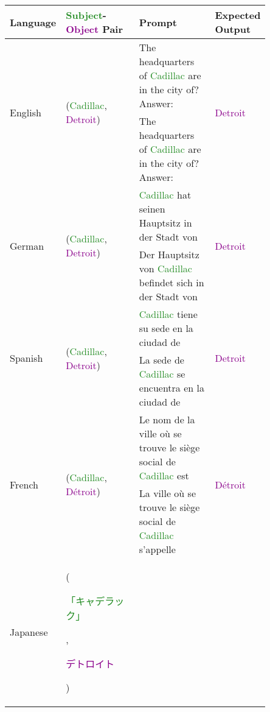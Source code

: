 \begin{table*}[htbp]
\scriptsize
\centering
\setlength{\tabcolsep}{1.0mm}{}
\begin{center}
\begin{tabular}{m{0.10\linewidth} p{0.30\linewidth} p{0.30\linewidth} m{0.15\linewidth}}
\textbf{Language} & \textbf{\textcolor{forestgreen}{Subject}-\textcolor{darkmagenta}{Object} Pair} & \textbf{Prompt} & \textbf{Expected Output} \\
\toprule
\multirow{2}{*}{\centering English} 
    & \multirow{2}{*}{\raggedright (\textcolor{forestgreen}{Cadillac}, \textcolor{darkmagenta}{Detroit})}
    & The headquarters of \textcolor{forestgreen}{Cadillac} are in the city of? \newline Answer:
    & \multirow{2}{*}{\centering \textcolor{darkmagenta}{Detroit}} \\
    & 
    & The headquarters of \textcolor{forestgreen}{Cadillac} are in the city of? \newline Answer:
    & \\
\midrule
\multirow{2}{*}{\centering German} 
    & \multirow{2}{*}{\raggedright (\textcolor{forestgreen}{Cadillac}, \textcolor{darkmagenta}{Detroit})}
    & \textcolor{forestgreen}{Cadillac} hat seinen Hauptsitz in der Stadt von 
    & \multirow{2}{*}{\centering \textcolor{darkmagenta}{Detroit}} \\
    & 
    & Der Hauptsitz von \textcolor{forestgreen}{Cadillac} befindet sich in der Stadt von 
    & \\
\midrule
\multirow{2}{*}{\centering Spanish} 
    & \multirow{2}{*}{\raggedright (\textcolor{forestgreen}{Cadillac}, \textcolor{darkmagenta}{Detroit})}
    & \textcolor{forestgreen}{Cadillac} tiene su sede en la ciudad de 
    & \multirow{2}{*}{\centering \textcolor{darkmagenta}{Detroit}} \\
    & 
    & La sede de \textcolor{forestgreen}{Cadillac} se encuentra en la ciudad de 
    & \\
\midrule
\multirow{2}{*}{\centering French} 
    & \multirow{2}{*}{\raggedright (\textcolor{forestgreen}{Cadillac}, \textcolor{darkmagenta}{Détroit})}
    & Le nom de la ville où se trouve le siège social de \textcolor{forestgreen}{Cadillac} est 
    & \multirow{2}{*}{\centering \textcolor{darkmagenta}{Détroit}} \\
    & 
    & La ville où se trouve le siège social de \textcolor{forestgreen}{Cadillac} s'appelle 
    & \\
\midrule
\multirow{2}{*}{\centering Japanese} 
    & \multirow{2}{*}{\raggedright (\textcolor{forestgreen}{\begin{CJK}{UTF8}{min}「キャデラック」\end{CJK}}, \textcolor{darkmagenta}{\begin{CJK}{UTF8}{min}デトロイト\end{CJK}})}

\end{tabular}
\end{center}
\end{table*}
